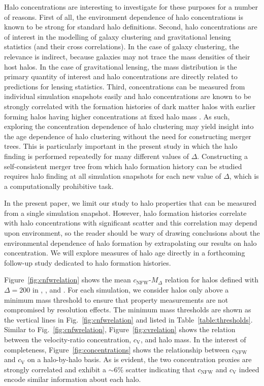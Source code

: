 \documentclass[usenatbib,fleqn]{mnras}
\begin{document}
Halo concentrations are interesting to investigate for these purposes for a number of reasons. 
First of all, the environment dependence of halo concentrations is known to be strong for 
standard halo definitions. Second, halo concentrations are of interest in the modelling of 
galaxy clustering and gravitational lensing statistics (and their cross correlations). 
In the case of galaxy clustering, the relevance is indirect, because galaxies may 
not trace the mass densities of their host halos. In the case 
of gravitational lensing, the mass distribution is the primary quantity of interest and halo concentrations are 
directly related to predictions for lensing statistics. Third, concentrations can be measured from 
individual simulation snapshots easily and halo concentrations are known to be strongly correlated with 
the formation histories of dark matter halos with earlier forming halos having higher concentrations at 
fixed halo mass \citep{wechsler_etal02, zhao_etal03, wechsler_etal06, zhao_etal09}. 
As such, exploring the concentration dependence of halo
clustering may yield insight into the age dependence of halo clustering without the need for constructing merger
trees. This is particularly important in the present study in which the halo finding is performed repeatedly for many 
different values of $\Delta$. Constructing a self-consistent merger tree from which halo formation history can be 
studied requires halo finding at all simulation snapshots for each new value of $\Delta$, which is a computationally 
prohibitive task. 

In the present paper, we limit our study to halo properties that can be measured from a single simulation 
snapshot. However, halo formation histories correlate with halo concentrations with significant scatter and this correlation may 
depend upon environment, so the reader should be wary of drawing conclusions about the environmental dependence of 
halo formation by extrapolating our results on halo concentration. 
We will explore measures of halo age directly in a forthcoming follow-up study dedicated to halo 
formation histories.

Figure~\ref{fig:cnfwrelation} shows the mean $c_{\mathrm{NFW}}$-$M_{\Delta}$ relation for halos defined with
$\Delta=200$ in \simA, \simB, and \simC. For each simulation, we consider halos only above a minimum mass threshold 
to ensure that property measurements are not compromised by resolution effects. The minimum mass 
thresholds are shown as the vertical lines in Fig.~\ref{fig:cnfwrelation} and listed in Table~\ref{table:thresholds}. 
Similar to Fig.~\ref{fig:cnfwrelation}, Figure~\ref{fig:cvrelation} shows the relation between the 
velocity-ratio concentration, $c_{\mathrm{V}}$, and halo mass. 
In the interest of completeness, Figure~\ref{fig:concentrations} shows the relationship 
between $c_{\mathrm{NFW}}$ and $c_{\mathrm{V}}$ on a halo-by-halo basis. As is evident, 
the two concentration proxies are strongly correlated and exhibit a $\sim 6\%$ scatter indicating 
that $c_{\mathrm{NFW}}$ and $c_{\mathrm{V}}$ indeed encode similar information about each 
halo.
\end{document}
